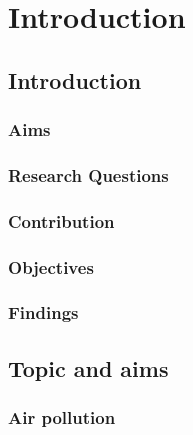 \newcommand{\novathesis}{\emph{novathesis}}
\newcommand{\novathesisclass}{\texttt{novathesis.cls}}



\chapter{Introduction}%
\label{cha:introduction}

\section{Introduction}%
\label{sec:introduction}

\subsection{Aims}%
\label{sub:aims}

\subsection{Research Questions}%
\label{sub:research_questions}

\subsection{Contribution}%
\label{sub:contribution}

\subsection{Objectives}%
\label{sub:objectives}

\subsection{Findings}%
\label{sub:findings}

\section{Topic and aims}%
\label{sec:topic_and_aims}

\subsection{Air pollution}%
\label{sub:air_pollution}

